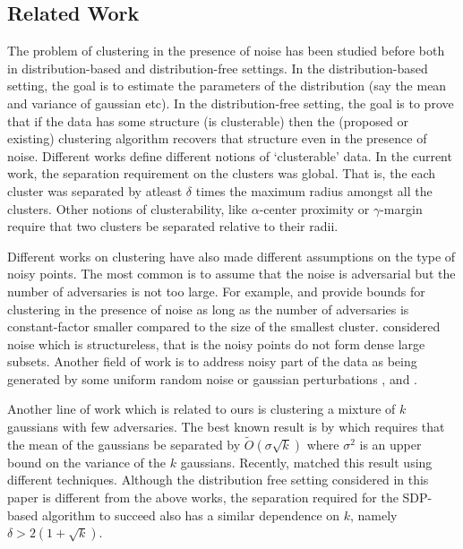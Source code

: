 \documentclass[12pt]{article}
\begin{document}
\subsection{Related Work}
The problem of clustering in the presence of noise has been studied before both in distribution-based and distribution-free settings. In the distribution-based setting, the goal is to estimate the parameters of the distribution (say the mean and variance of gaussian etc). In the distribution-free setting, the goal is to prove that if the data has some structure (is clusterable) then the (proposed or existing) clustering algorithm recovers that structure even in the presence of noise. Different works define different notions of `clusterable' data. In the current work, the separation requirement on the clusters was global. That is, the each cluster was separated by atleast $\delta$ times the maximum radius amongst all the clusters. Other notions of clusterability, like $\alpha$-center proximity \cite{awasthi2012center}or $\gamma$-margin \cite{ashtiani2016clustering} require that two clusters be separated relative to their radii.

Different works on clustering have also made different assumptions on the type of noisy points. The most common is to assume that the noise is adversarial but the number of adversaries is not too large. For example, \cite{balcan2012clustering} and \cite{balcan2008discriminative} provide bounds for clustering in the presence of noise as long as the number of adversaries is constant-factor smaller compared to the size of the smallest cluster. \cite{kushagra2016finding} considered noise which is structureless, that is the noisy points do not form dense large subsets. Another field of work is to address noisy part of the data as being generated by some uniform random noise or gaussian perturbations \cite{cuesta1997trimmed}, \cite{garcia2008general} and \cite{dave1993robust}.  

Another line of work which is related to ours is clustering a mixture of $k$ gaussians with few adversaries. The best known result is by \cite{awasthi2012improved} which requires that the mean of the gaussians be separated by $\tilde O(\sigma \sqrt{k})$ where $\sigma^2$ is an upper bound on the variance of the $k$ gaussians. Recently, \cite{charikar2017learning} matched this result using different techniques. Although the distribution free setting considered in this paper is different from the above works, the separation required for the SDP-based algorithm to succeed also has a similar dependence on $k$, namely $\delta > 2(1 + \sqrt{k})$. 
\end{document}
